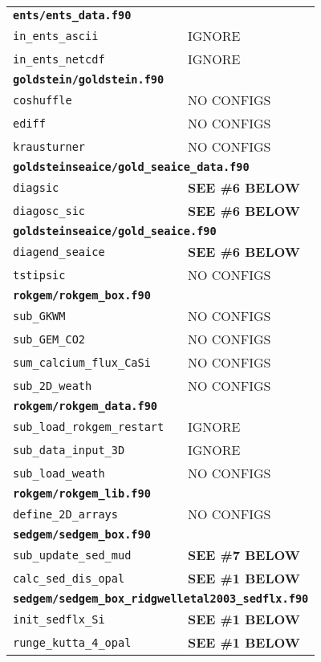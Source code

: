 \documentclass[a4paper,10pt,article]{memoir}
\begin{document}
\begin{tabular}{ll}
  \multicolumn{2}{l}{\textbf{\texttt{ents/ents\_data.f90}}} \\
  \texttt{in\_ents\_ascii}  & IGNORE \\
  \texttt{in\_ents\_netcdf} & IGNORE \\

  \multicolumn{2}{l}{\textbf{\texttt{goldstein/goldstein.f90}}} \\
  \texttt{coshuffle}   & NO CONFIGS \\
  \texttt{ediff}       & NO CONFIGS \\
  \texttt{krausturner} & NO CONFIGS \\

  \multicolumn{2}{l}{\textbf{\texttt{goldsteinseaice/gold\_seaice\_data.f90}}} \\
  \texttt{diagsic}      & \textbf{SEE \#6 BELOW} \\
  \texttt{diagosc\_sic} & \textbf{SEE \#6 BELOW} \\

  \multicolumn{2}{l}{\textbf{\texttt{goldsteinseaice/gold\_seaice.f90}}} \\
  \texttt{diagend\_seaice} & \textbf{SEE \#6 BELOW} \\
  \texttt{tstipsic}        & NO CONFIGS \\

  \multicolumn{2}{l}{\textbf{\texttt{rokgem/rokgem\_box.f90}}} \\
  \texttt{sub\_GKWM}                & NO CONFIGS \\
  \texttt{sub\_GEM\_CO2}            & NO CONFIGS \\
  \texttt{sum\_calcium\_flux\_CaSi} & NO CONFIGS \\
  \texttt{sub\_2D\_weath}           & NO CONFIGS \\

  \multicolumn{2}{l}{\textbf{\texttt{rokgem/rokgem\_data.f90}}} \\
  \texttt{sub\_load\_rokgem\_restart} & IGNORE \\
  \texttt{sub\_data\_input\_3D}       & IGNORE \\
  \texttt{sub\_load\_weath}           & NO CONFIGS \\

  \multicolumn{2}{l}{\textbf{\texttt{rokgem/rokgem\_lib.f90}}} \\
  \texttt{define\_2D\_arrays} & NO CONFIGS \\

  \multicolumn{2}{l}{\textbf{\texttt{sedgem/sedgem\_box.f90}}} \\
  \texttt{sub\_update\_sed\_mud} & \textbf{SEE \#7 BELOW} \\
  \texttt{calc\_sed\_dis\_opal}  & \textbf{SEE \#1 BELOW} \\

  \multicolumn{2}{l}{\textbf{\texttt{sedgem/sedgem\_box\_ridgwelletal2003\_sedflx.f90}}} \\
  \texttt{init\_sedflx\_Si}      & \textbf{SEE \#1 BELOW} \\
  \texttt{runge\_kutta\_4\_opal} & \textbf{SEE \#1 BELOW} \\
\end{tabular}
\end{document}
